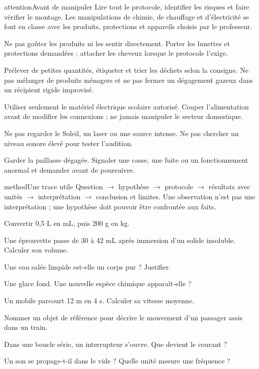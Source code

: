 \clearpage{}
\begin{pcEncadre}{attention}{Avant de manipuler}
Lire tout le protocole, identifier les risques et faire vérifier le montage. Les manipulations de chimie, de chauffage et d’électricité se font en classe avec les produits, protections et appareils choisis par le professeur.
\end{pcEncadre}
\begin{questions}
\item Ne pas goûter les produits ni les sentir directement. Porter les lunettes et protections demandées ; attacher les cheveux lorsque le protocole l’exige.
\item Prélever de petites quantités, étiqueter et trier les déchets selon la consigne. Ne pas mélanger de produits ménagers et ne pas fermer un dégagement gazeux dans un récipient rigide improvisé.
\item Utiliser seulement le matériel électrique scolaire autorisé. Couper l’alimentation avant de modifier les connexions ; ne jamais manipuler le secteur domestique.
\item Ne pas regarder le Soleil, un laser ou une source intense. Ne pas chercher un niveau sonore élevé pour tester l’audition.
\item Garder la paillasse dégagée. Signaler une casse, une fuite ou un fonctionnement anormal et demander avant de poursuivre.
\end{questions}
\begin{pcEncadre}{method}{Une trace utile}
Question $\rightarrow$ hypothèse $\rightarrow$ protocole $\rightarrow$ résultats avec unités $\rightarrow$ interprétation $\rightarrow$ conclusion et limites. Une observation n’est pas une interprétation ; une hypothèse doit pouvoir être confrontée aux faits.
\end{pcEncadre}
\clearpage{}
\begin{questions}
\item Convertir 0,5 L en mL, puis 200 g en kg.
\item Une éprouvette passe de 30 à 42 mL après immersion d’un solide insoluble. Calculer son volume.
\item Une eau salée limpide est-elle un corps pur ? Justifier.
\item Une glace fond. Une nouvelle espèce chimique apparaît-elle ?
\item Un mobile parcourt 12 m en 4 s. Calculer sa vitesse moyenne.
\item Nommer un objet de référence pour décrire le mouvement d’un passager assis dans un train.
\item Dans une boucle série, un interrupteur s’ouvre. Que devient le courant ?
\item Un son se propage-t-il dans le vide ? Quelle unité mesure une fréquence ?
\end{questions}
